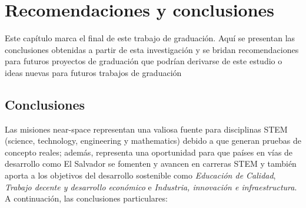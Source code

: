 \chapter{Recomendaciones y conclusiones} \label{chp:resultados}

\vspace{0.4cm}

Este capítulo marca el final de este trabajo de graduación. Aquí se presentan las conclusiones obtenidas a partir de esta investigación y se bridan recomendaciones para futuros proyectos de graduación que podrían derivarse de este estudio o ideas nuevas para futuros trabajos de graduación

\newpage



\section{Conclusiones} \label{sct:resultados_conclusiones}

Las misiones near-space representan una valiosa fuente para disciplinas STEM (science, technology, engineering y mathematics) debido a que generan pruebas de concepto reales; además,  representa una oportunidad para que países en vías de desarrollo como El Salvador se fomenten y avancen en carreras STEM y también aporta a los objetivos del desarrollo sostenible como \textit{Educación de Calidad}, \textit{Trabajo decente y desarrollo económico} e \textit{Industria, innovación e infraestructura}. A continuación, las conclusiones particulares: 

